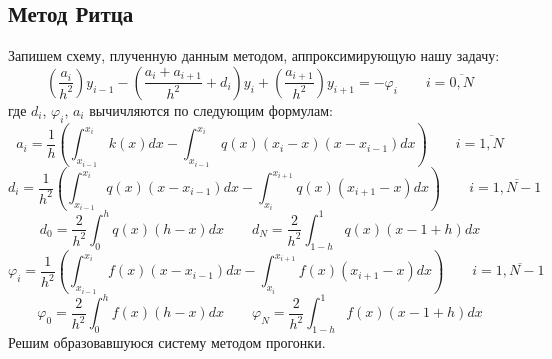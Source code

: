\documentclass[12pt]{article}
\begin{document}
	\subsection*{Метод Ритца}
		Запишем схему, плученную данным методом, аппроксимирующую нашу задачу:
		$$
			\left( \dfrac{a_i}{h^2} \right) y_{i-1} - 
			\left( \dfrac{a_{i} + a_{i+1}}{h^2} + d_i \right) y_i +
			\left( \frac{ a_{i+1}}{h^2} \right) y_{i+1} =
			-\varphi_i 
			\qquad
			i = \overline{0, N}
		$$
		где $d_i$, $\varphi_i$, $a_i$ вычичляются по следующим формулам:
		$$
			a_{i} =
			\dfrac{1}{h}
			\left(
				\int_{x_{i-1}}^{x_i} k(x)dx -
				\int_{x_{i-1}}^{x_i} q(x)(x_i-x)(x-x_{i-1})dx 
			\right) 
			\qquad 
			i = \overline{1,N}
		$$
		$$
			d_i=
			\frac{1}{h^2}
			\left(
				\int_{x_{i-1}}^{x_i} q(x)(x-x_{i-1})dx -
				\int_{x_{i}}^{x_{i+1}} q(x)(x_{i+1} - x)dx 
			\right)
			\qquad
			i = \overline{1,N-1}
		$$
		$$
			d_0=
			\frac{2}{h^2}
			\int_{0}^{h}q(x)(h-x)dx
			\qquad				
			d_N=
			\frac{2}{h^2}
			\int_{1-h}^{1}q(x)(x-1+h)dx
		$$
		$$
			\varphi_i=
			\frac{1}{h^2}
			\left(
				\int_{x_{i-1}}^{x_i}f(x)(x - x_{i-1})dx -
				\int_{x_{i}}^{x_{i+1}}f(x)(x_{i+1} - x)dx 
			\right)
			\qquad
			 i= \overline{1,N-1}
		$$
		$$
			\varphi_0=
			\frac{2}{h^2}
			\int_{0}^{h}f(x)(h - x)dx
			\qquad			
			\varphi_N=
			\frac{2}{h^2}
			\int_{1-h}^{1}
			f(x)(x - 1 + h)dx
		$$
		Решим образовавшуюся систему методом прогонки.
	
\newpage
\end{document}

